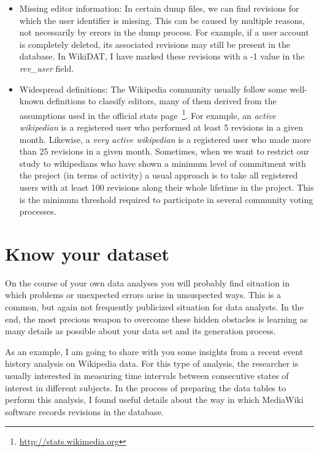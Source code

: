 \begin{itemize}
 \item Missing editor information: In certain dump files, we can find revisions
for which the user identifier is missing. This can be caused by multiple reasons,
not necessarily by errors in the dump process. For example, if a user account is
completely deleted, its associated revisions may still be present in the database.
In WikiDAT, I have marked these revisions with a -1 value in the \textit{rev\_user}
field.

 \item Widespread definitions: The Wikipedia community usually follow some well-known
definitions to classify editors, many of them derived from the assumptions used
in the official stats page~\footnote{\url{http://stats.wikimedia.org}}. For example,
an \textit{active wikipedian} is a registered user who performed at least 5 revisions
in a given month. Likewise, a \textit{very active wikipedian} is a registered user who
made more than 25 revisions in a given month. Sometimes, when we want to restrict our
study to wikipedians who have shown a minimum level of commitment with the project
(in terms of activity) a usual approach is to take all registered users with at least
100 revisions along their whole lifetime in the project. This is the minimum threshold
required to participate in several community voting processes.

\end{itemize}


\section{Know your dataset}
On the course of your own data analyses you will probably find situation in which
problems or unexpected errors arise in unsuspected ways. This is a common, but
again not frequently publicized situation for data analysts. In the end, the most
precious weapon to overcome these hidden obstacles is learning as many details
as possible about your data set and its generation process.

As an example, I am going to share with you some insights from a recent event
history analysis on Wikipedia data. For this type of analysis, the researcher is
usually interested in measuring time intervals between consecutive states of interest
in different subjects. In the process of preparing the data tables to perform this
analysis, I found useful details about the way in which MediaWiki software records
revisions in the database.

